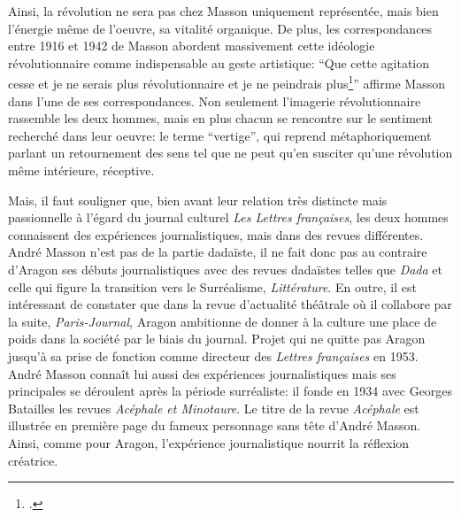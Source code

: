 Ainsi, la révolution ne sera pas chez Masson uniquement représentée, mais bien l’énergie même de l’oeuvre, sa vitalité organique. De plus, les correspondances  entre 1916 et 1942 de Masson abordent massivement cette idéologie  révolutionnaire comme indispensable au geste artistique: \enquote{Que cette agitation cesse et je ne serais plus révolutionnaire et je ne peindrais plus\footcite[p. 102]{anneessurrealistes}} affirme Masson dans l’une de ses correspondances. Non seulement l’imagerie révolutionnaire rassemble les deux hommes, mais en plus chacun se rencontre sur le sentiment recherché dans leur oeuvre: le terme \enquote{vertige}, qui reprend métaphoriquement parlant un retournement des sens tel que ne peut qu’en susciter qu’une révolution même intérieure, réceptive. 

Mais, il faut souligner que, bien avant leur relation très distincte mais passionnelle à l’égard du journal culturel \emph{Les Lettres françaises}, les deux hommes connaissent des expériences journalistiques, mais dans des revues différentes. André Masson n’est pas de la partie dadaïste, il ne fait donc pas au contraire d’Aragon ses débuts journalistiques avec des revues dadaïstes telles que \emph{Dada} et celle qui figure la transition vers le Surréalisme, \emph{Littérature}. En outre, il est intéressant de constater que dans la revue d’actualité théâtrale où il collabore par la suite, \emph{Paris-Journal}, Aragon ambitionne de donner à la culture une place de poids dans la société par le biais du journal. Projet qui ne quitte pas Aragon jusqu’à sa prise de fonction comme directeur des \emph{Lettres françaises} en 1953. André Masson connaît lui aussi des expériences journalistiques mais ses principales se déroulent après la période surréaliste: il fonde en 1934 avec Georges Batailles les revues \emph{Acéphale et Minotaure}. Le titre de la revue \emph{Acéphale} est illustrée en première page du fameux personnage sans tête d’André Masson. Ainsi, comme pour Aragon, l’expérience journalistique nourrit la réflexion créatrice. 

